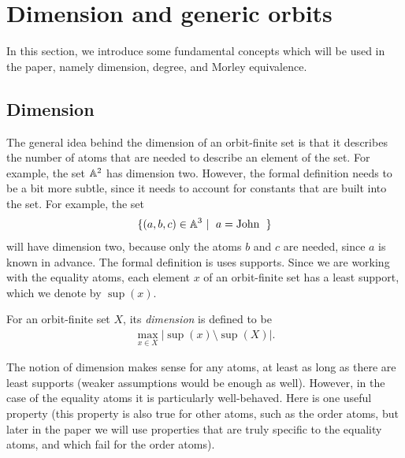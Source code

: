 \section{Dimension and generic orbits}
\label{sec:generic-orbits}
In this section, we introduce some fundamental concepts which will be used in the paper, namely dimension, degree, and Morley equivalence.

\subsection{Dimension}
\label{sec:dimension}
The general idea behind the dimension of an orbit-finite set is that it describes the number of atoms that are needed to describe an element of the set. For example, the set $\mathbb A^2$ has dimension two. However, the formal definition needs to be a bit more subtle, since it needs to account for constants that are built into the set. For example, the set
\begin{align*}
\setbuild{(a,b,c) \in \atoms^3}{$a = \john$}
\end{align*}
will have dimension two, because only the atoms $b$ and $c$ are needed, since $a$ is known in advance. The formal definition is uses supports. Since we are  working with the equality atoms, each element $x$ of an orbit-finite set has a least support, which we denote by $\sup(x)$.
\begin{definition}
	[Dimension] \label{def:dimension} For an orbit-finite set $X$, its \emph{dimension} is defined to be
	\begin{align*}
		\max_{x \in X} |\sup(x) \setminus \sup(X)|.
	\end{align*}
\end{definition}
The notion of dimension makes sense for any atoms, at least as long as there are least supports (weaker assumptions would be enough as well). However, in the case of the equality atoms it is particularly well-behaved. Here is one useful property (this property is also true for other atoms, such as the order atoms, but later in the paper we will use properties that are truly specific to the equality atoms, and which fail for the order atoms).

